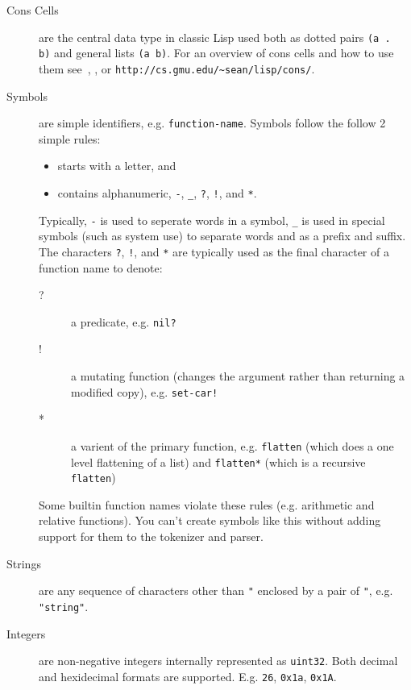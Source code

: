 \documentclass[12pt]{article}
\begin{document}
\begin{description}

\item[Cons Cells] are the central data type in classic Lisp used both
  as dotted pairs \verb|(a .  b)| and general lists \verb|(a b)|. For
  an overview of cons cells and how to use them
  see~\cite{Abelson85Structure}, \cite{Steele:1984:CLL}, or
  \verb|http://cs.gmu.edu/~sean/lisp/cons/|.

\item[Symbols] are simple identifiers, e.g. \verb|function-name|.
Symbols follow the follow 2 simple rules:

\begin{itemize}
\item starts with a letter, and
\item contains alphanumeric, \verb|-|, \verb|_|, \verb|?|, \verb|!|, and \verb|*|.
\end{itemize}

Typically, \verb|-| is used to seperate words in a symbol, \verb|_| is
used in special symbols (such as system use) to separate words and as
a prefix and suffix. The characters \verb|?|, \verb|!|, and \verb|*|
are typically used as the final character of a function name to
denote:

\begin{description}
\item [?] a predicate, e.g. \verb|nil?|
\item [!] a mutating function (changes the argument rather than
  returning a modified copy), e.g. \verb|set-car!|
\item [*] a varient of the primary function, e.g. \verb|flatten|
  (which does a one level flattening of a list) and \verb|flatten*|
  (which is a recursive \verb|flatten|)
\end{description}

Some builtin function names violate these rules (e.g. arithmetic and
relative functions). You can't create symbols like this without
adding support for them to the tokenizer and parser.

\item[Strings] are any sequence of characters other than \verb|"|
enclosed by a pair of \verb|"|, e.g. \verb|"string"|.

\item[Integers] are non-negative integers internally represented as \verb|uint32|. Both decimal and hexidecimal formats are supported. E.g.
  \verb|26|, \verb|0x1a|, \verb|0x1A|.


\end{description}
\end{document}
